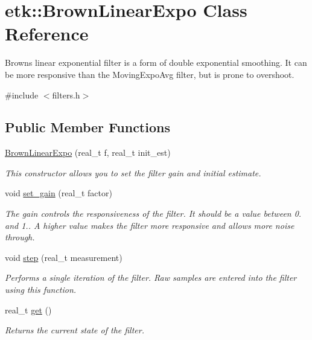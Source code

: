 \hypertarget{classetk_1_1_brown_linear_expo}{\section{etk\-:\-:Brown\-Linear\-Expo Class Reference}
\label{classetk_1_1_brown_linear_expo}
}


Browns linear exponential filter is a form of double exponential smoothing. It can be more responsive than the Moving\-Expo\-Avg filter, but is prone to overshoot.  




{\ttfamily \#include $<$filters.\-h$>$}

\subsection*{Public Member Functions}
\begin{DoxyCompactItemize}
\item 
\hyperlink{classetk_1_1_brown_linear_expo_a70bc499169a293049b848108d4889120}{Brown\-Linear\-Expo} (real\-\_\-t f, real\-\_\-t init\-\_\-est)
\begin{DoxyCompactList}\small\item\em This constructor allows you to set the filter gain and initial estimate. \end{DoxyCompactList}\item 
void \hyperlink{classetk_1_1_brown_linear_expo_a8528af67ac4d54ddadde5016b41dd825}{set\-\_\-gain} (real\-\_\-t factor)
\begin{DoxyCompactList}\small\item\em The gain controls the responsiveness of the filter. It should be a value between 0. and 1.. A higher value makes the filter more responsive and allows more noise through. \end{DoxyCompactList}\item 
void \hyperlink{classetk_1_1_brown_linear_expo_a492d7bbd9ff10c945d86bf001ec9d91c}{step} (real\-\_\-t measurement)
\begin{DoxyCompactList}\small\item\em Performs a single iteration of the filter. Raw samples are entered into the filter using this function. \end{DoxyCompactList}\item 
\hypertarget{classetk_1_1_brown_linear_expo_abdb065542f70c50d79c03a3eeeef7e2e}{real\-\_\-t \hyperlink{classetk_1_1_brown_linear_expo_abdb065542f70c50d79c03a3eeeef7e2e}{get} ()}\label{classetk_1_1_brown_linear_expo_abdb065542f70c50d79c03a3eeeef7e2e}

\begin{DoxyCompactList}\small\item\em Returns the current state of the filter. \end{DoxyCompactList}\end{DoxyCompactItemize}


